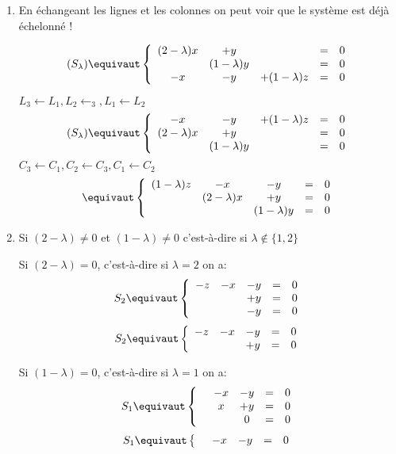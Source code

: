 \documentclass[a4paper, 11pt,reqno]{article}
\begin{document}
\begin{correction}
\begin{enumerate}
\item En échangeant les lignes et les colonnes on peut voir que le système est déjà échelonné ! 

$$(S_\lambda)\equivaut  \left\{ \begin{array}{ccccc}
(2-\lambda)x &+y& & =&0 \\
 &(1-\lambda)y & & =& 0 \\
 -x&-y&+(1-\lambda)z&=&0
\end{array}\right. $$

$L_3\leftarrow L_1, L_2 \leftarrow _3, L_1\leftarrow L_2$
$$
(S_\lambda)\equivaut  \left\{ \begin{array}{ccccc}
 -x&-y&+(1-\lambda)z&=&0\\
(2-\lambda)x &+y& & =&0 \\
 &(1-\lambda)y & & =& 0 
\end{array}\right.$$
$ C_3\leftarrow C_1, C_2 \leftarrow C_3, C_1\leftarrow C_2$
$$
\equivaut \left\{ \begin{array}{ccccc}
 (1-\lambda)z&-x&-y&=&0\\
 &(2-\lambda)x&+y & =&0 \\
 &  & (1-\lambda)y& =& 0 
\end{array}\right.$$


\item Si $(2-\lambda)\neq 0$ et $(1-\lambda)\neq 0$ c'est-à-dire si $\lambda \notin\{ 1,2\}$ 

Si  $(2-\lambda)= 0$,  c'est-à-dire si $\lambda=2$ on a:
$$S_2\equivaut  \left\{ \begin{array}{ccccc}
 -z&-x&-y&=&0\\
 & &+y & =&0 \\
 &  & -y& =& 0 
\end{array}\right.$$
$$S_2\equivaut  \left\{ \begin{array}{ccccc}
 -z&-x&-y&=&0\\
 & &+y & =&0 
\end{array}\right.$$

Si  $(1-\lambda)= 0$,  c'est-à-dire si $\lambda=1$ on a:
$$S_1\equivaut  \left\{ \begin{array}{ccccc}
 &-x&-y&=&0\\
 & x&+y & =&0 \\
 &  &0 & =& 0 
\end{array}\right.$$
$$S_1\equivaut  \left\{ \begin{array}{ccccc}
 &-x&-y&=&0
\end{array}\right.$$



\end{enumerate}
\end{correction}
\end{document}
